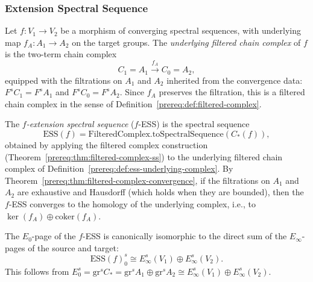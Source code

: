 \subsubsection{Extension Spectral Sequence}\label{sec:prereq-ess}

\begin{definition}\label{prereq:def:ess-underlying-complex}
    Let $f: V_1 \to V_2$ be a morphism of converging spectral sequences, with underlying map $f_A: A_1 \to A_2$ on the target groups. The \emph{underlying filtered chain complex} of $f$ is the two-term chain complex
    $$C_1 = A_1 \xrightarrow{f_A} C_0 = A_2,$$
    equipped with the filtrations on $A_1$ and $A_2$ inherited from the convergence data: $F^s C_1 = F^s A_1$ and $F^s C_0 = F^s A_2$. Since $f_A$ preserves the filtration, this is a filtered chain complex in the sense of Definition~\ref{prereq:def:filtered-complex}.
\end{definition}

\begin{definition}\label{prereq:def:ess}
    \leanok
    The \emph{$f$-extension spectral sequence} ($f$-ESS) is the spectral sequence
    $$\mathrm{ESS}(f) = \mathrm{FilteredComplex.toSpectralSequence}(C_*(f)),$$
    obtained by applying the filtered complex construction (Theorem~\ref{prereq:thm:filtered-complex-ss}) to the underlying filtered chain complex of Definition~\ref{prereq:def:ess-underlying-complex}. By Theorem~\ref{prereq:thm:filtered-complex-convergence}, if the filtrations on $A_1$ and $A_2$ are exhaustive and Hausdorff (which holds when they are bounded), then the $f$-ESS converges to the homology of the underlying complex, i.e., to $\ker(f_A) \oplus \mathrm{coker}(f_A)$.
\end{definition}

\begin{axiom}\label{prereq:ax:ess-e0-iso}
    \notready
    The $E_0$-page of the $f$-ESS is canonically isomorphic to the direct sum of the $E_\infty$-pages of the source and target:
    $$\mathrm{ESS}(f)_0^{s} \cong E_\infty^{s}(V_1) \oplus E_\infty^{s}(V_2).$$
    This follows from $E_0^s = \mathrm{gr}^s C_* = \mathrm{gr}^s A_1 \oplus \mathrm{gr}^s A_2 \cong E_\infty^s(V_1) \oplus E_\infty^s(V_2)$.
\end{axiom}

